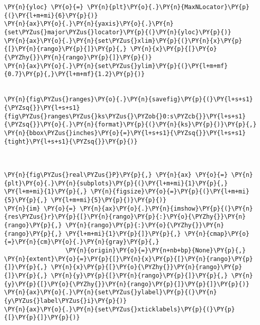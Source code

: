 \begin{Verbatim}[commandchars=\\\{\}]
\PY{n}{yloc} \PY{o}{=} \PY{n}{plt}\PY{o}{.}\PY{n}{MaxNLocator}\PY{p}{(}\PY{l+m+mi}{6}\PY{p}{)}
\PY{n}{ax}\PY{o}{.}\PY{n}{yaxis}\PY{o}{.}\PY{n}{set\PYZus{}major\PYZus{}locator}\PY{p}{(}\PY{n}{yloc}\PY{p}{)}
\PY{n}{ax}\PY{o}{.}\PY{n}{set\PYZus{}xlim}\PY{p}{(}\PY{n}{x}\PY{p}{[}\PY{n}{rango}\PY{p}{]}\PY{p}{,} \PY{n}{x}\PY{p}{[}\PY{o}{\PYZhy{}}\PY{n}{rango}\PY{p}{]}\PY{p}{)}
\PY{n}{ax}\PY{o}{.}\PY{n}{set\PYZus{}ylim}\PY{p}{(}\PY{l+m+mf}{0.7}\PY{p}{,}\PY{l+m+mf}{1.2}\PY{p}{)}


\PY{n}{fig\PYZus{}ranges}\PY{o}{.}\PY{n}{savefig}\PY{p}{(}\PY{l+s+s1}{\PYZsq{}}\PY{l+s+s1}{fig\PYZus{}ranges\PYZus{}ks\PYZus{}\PYZob{}0:s\PYZcb{}}\PY{l+s+s1}{\PYZsq{}}\PY{o}{.}\PY{n}{format}\PY{p}{(}\PY{n}{ks}\PY{p}{)}\PY{p}{,} \PY{n}{bbox\PYZus{}inches}\PY{o}{=}\PY{l+s+s1}{\PYZsq{}}\PY{l+s+s1}{tight}\PY{l+s+s1}{\PYZsq{}}\PY{p}{)}



\PY{n}{fig\PYZus{}real\PYZus{}P}\PY{p}{,} \PY{n}{ax} \PY{o}{=} \PY{n}{plt}\PY{o}{.}\PY{n}{subplots}\PY{p}{(}\PY{l+m+mi}{1}\PY{p}{,} \PY{l+m+mi}{1}\PY{p}{,} \PY{n}{figsize}\PY{o}{=}\PY{p}{(}\PY{l+m+mi}{5}\PY{p}{,} \PY{l+m+mi}{5}\PY{p}{)}\PY{p}{)}
\PY{n}{im} \PY{o}{=} \PY{n}{ax}\PY{o}{.}\PY{n}{imshow}\PY{p}{(}\PY{n}{res\PYZus{}r}\PY{p}{[}\PY{n}{rango}\PY{p}{:}\PY{o}{\PYZhy{}}\PY{n}{rango}\PY{p}{,} \PY{n}{rango}\PY{p}{:}\PY{o}{\PYZhy{}}\PY{n}{rango}\PY{p}{,} \PY{l+m+mi}{1}\PY{p}{]}\PY{p}{,} \PY{n}{cmap}\PY{o}{=}\PY{n}{cm}\PY{o}{.}\PY{n}{gray}\PY{p}{,}
                 \PY{n}{origin}\PY{o}{=}\PY{n+nb+bp}{None}\PY{p}{,} \PY{n}{extent}\PY{o}{=}\PY{p}{[}\PY{n}{x}\PY{p}{[}\PY{n}{rango}\PY{p}{]}\PY{p}{,} \PY{n}{x}\PY{p}{[}\PY{o}{\PYZhy{}}\PY{n}{rango}\PY{p}{]}\PY{p}{,} \PY{n}{y}\PY{p}{[}\PY{n}{rango}\PY{p}{]}\PY{p}{,} \PY{n}{y}\PY{p}{[}\PY{o}{\PYZhy{}}\PY{n}{rango}\PY{p}{]}\PY{p}{]}\PY{p}{)}
\PY{n}{ax}\PY{o}{.}\PY{n}{set\PYZus{}ylabel}\PY{p}{(}\PY{n}{y\PYZus{}label\PYZus{}i}\PY{p}{)}
\PY{n}{ax}\PY{o}{.}\PY{n}{set\PYZus{}xticklabels}\PY{p}{(}\PY{p}{[}\PY{p}{]}\PY{p}{)}


\end{Verbatim}
